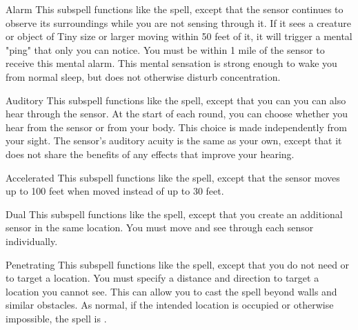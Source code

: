 \begin{ability}[\nth{2}]{Alarm}
This subspell functions like the  spell, except that the sensor continues to observe its surroundings while you are not sensing through it.
If it sees a creature or object of Tiny size or larger moving within 50 feet of it, it will trigger a mental "ping" that only you can notice.
You must be within 1 mile of the sensor to receive this mental alarm.
This mental sensation is strong enough to wake you from normal sleep, but does not otherwise disturb concentration.
\end{ability}
\vspace{0.25em}


\begin{ability}[\nth{2}]{Auditory}
This subspell functions like the  spell, except that you can you can also hear through the sensor.
At the start of each round, you can choose whether you hear from the sensor or from your body.
This choice is made independently from your sight.
The sensor's auditory acuity is the same as your own, except that it does not share the benefits of any  effects that improve your hearing.
\end{ability}
\vspace{0.25em}


\begin{ability}[\nth{3}]{Accelerated}
This subspell functions like the  spell, except that the sensor moves up to 100 feet when moved instead of up to 30 feet.
\end{ability}
\vspace{0.25em}


\begin{ability}[\nth{3}]{Dual}
This subspell functions like the  spell, except that you create an additional sensor in the same location.
You must move and see through each sensor individually.
\end{ability}
\vspace{0.25em}


\begin{ability}[\nth{3}]{Penetrating}
This subspell functions like the  spell, except that you do not need  or  to target a location.
You must specify a distance and direction to target a location you cannot see.
This can allow you to cast the spell beyond walls and similar obstacles.
As normal, if the intended location is occupied or otherwise impossible, the spell is .
\end{ability}
\vspace{0.25em}


